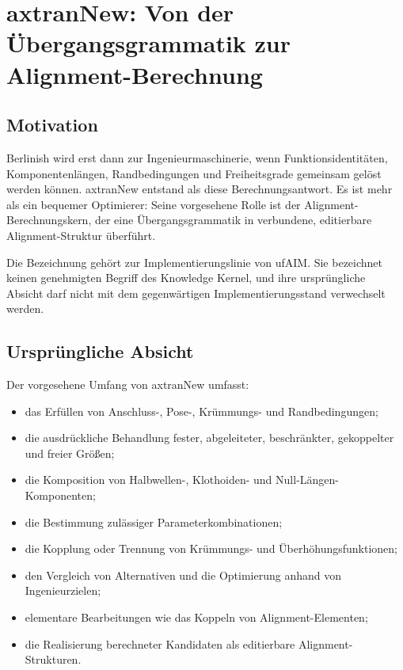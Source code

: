 \chapter{axtranNew: Von der Übergangsgrammatik zur Alignment-Berechnung}
\label{chap:axtran-reinterpretation}

\section*{Motivation}

Berlinish wird erst dann zur Ingenieurmaschinerie, wenn Funktionsidentitäten,
Komponentenlängen, Randbedingungen und Freiheitsgrade gemeinsam gelöst werden
können. axtranNew entstand als diese Berechnungsantwort. Es ist mehr als ein
bequemer Optimierer: Seine vorgesehene Rolle ist der
Alignment-Berechnungskern, der eine Übergangsgrammatik in verbundene,
editierbare Alignment-Struktur überführt.

Die Bezeichnung gehört zur Implementierungslinie von ufAIM. Sie bezeichnet
keinen genehmigten Begriff des Knowledge Kernel, und ihre ursprüngliche Absicht
darf nicht mit dem gegenwärtigen Implementierungsstand verwechselt werden.

\section{Ursprüngliche Absicht}

Der vorgesehene Umfang von axtranNew umfasst:
\begin{itemize}
\item das Erfüllen von Anschluss-, Pose-, Krümmungs- und Randbedingungen;
\item die ausdrückliche Behandlung fester, abgeleiteter, beschränkter,
gekoppelter und freier Größen;
\item die Komposition von Halbwellen-, Klothoiden- und
Null-Längen-Komponenten;
\item die Bestimmung zulässiger Parameterkombinationen;
\item die Kopplung oder Trennung von Krümmungs- und Überhöhungsfunktionen;
\item den Vergleich von Alternativen und die Optimierung anhand von
Ingenieurzielen;
\item elementare Bearbeitungen wie das Koppeln von Alignment-Elementen;
\item die Realisierung berechneter Kandidaten als editierbare
Alignment-Strukturen.
\end{itemize}

